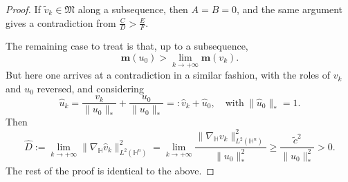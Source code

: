 \documentclass[10pt,a4paper]{amsart}
\begin{document}
\begin{proof}
{If $\tilde v_k\in\mathfrak M$ along a subsequence, then $A=B=0$, and the same argument gives a contradiction from $\frac{C}{D}>\frac{E}{F}$.}

 The remaining case to treat is that, up to a subsequence,
\begin{equation*}
 \mathbf{m}(u_0)>\lim\limits_{k\rightarrow+\infty} \mathbf{m}(v_k).
\end{equation*}
But here one arrives at a contradiction in a similar fashion, with the roles of $v_k$ and $u_0$
reversed, and considering
\begin{equation*}
 \hat{u}_k=\frac{v_k}{\|u_0\|_*}+\frac{u_0}{\|u_0\|_*}=:\hat{v}_k+\hat{u}_{0},\quad \mathrm{with}~\|\hat{u}_0\|_*=1.
\end{equation*}
Then
\begin{equation*}
\hat{D}:=\lim\limits_{k\rightarrow+\infty}\|\nabla_\mathbb{H} \hat{v}_{k}\|_{L^2(\mathbb{H}^n)}^2=\lim\limits_{k\rightarrow+\infty}\frac{\|\nabla_\mathbb{H} {v}_{k}\|_{L^2(\mathbb{H}^n)}^2}{\|u_0\|_*^2}\geq \frac{\tilde{c}^2}{\|u_0\|_*^2}>0.
\end{equation*}
The rest of the proof is identical to the above.
\end{proof}
\end{document}
